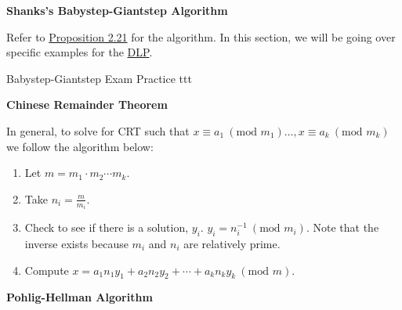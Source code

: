 \begin{center}
    \textbf{Shanks's Babystep-Giantstep Algorithm}
\end{center}

Refer to \hyperlink{2.21}{Proposition 2.21} for the algorithm. In this section, we will be going over specific examples for the \hyperlink{Discrete Logarithm Problem}{DLP}.

\begin{example}
    {Babystep-Giantstep Exam Practice} ttt
\end{example}

\begin{center}
    \textbf{Chinese Remainder Theorem}
\end{center}

In general, to solve for CRT such that \(x \equiv a_1 \ (\text{mod } m_1)\dots, x \equiv a_k \ (\text{mod } m_k)\) we follow the algorithm below:
\begin{enumerate}
    \item Let \(m = m_1 \cdot m_2 \cdots m_k\).
    \item Take \(n_i = \frac{m}{m_i}\).
    \item  Check to see if there is a solution, \(y_i\). \(y_i = n_i^{-1} \ (\text{mod } m_i)\). Note that the inverse exists because \(m_i\) and \(n_i\) are relatively prime.
    \item Compute \(x = a_1n_1y_1 + a_2n_2y_2 + \cdots + a_kn_ky_k \ (\text{mod } m)\).
\end{enumerate}

\begin{center}
    \textbf{Pohlig-Hellman Algorithm}
\end{center}


